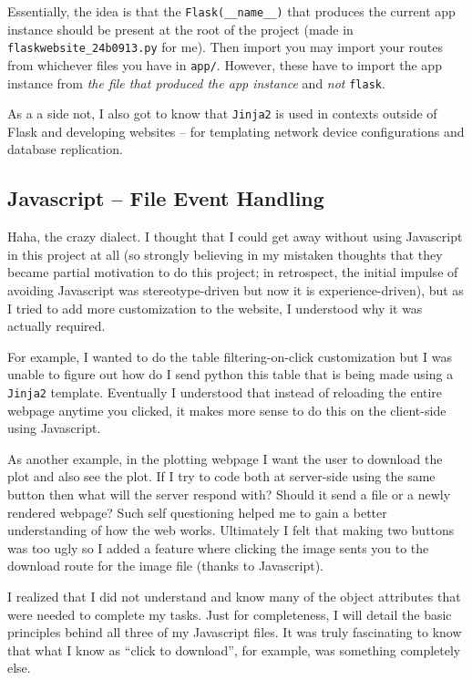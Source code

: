 \documentclass[11pt]{scrartcl}
\begin{document}
Essentially, the idea is that the \texttt{Flask(\_\_name\_\_)} that produces the
current app instance should be present at the root of the project (made
in \texttt{flaskwebsite\_24b0913.py} for me). Then import you may import your
routes from whichever files you have in \texttt{app/}. However, these have to
import the app instance from \emph{the file that produced the app instance} and
\emph{not} \texttt{flask}.

As a a side not, I also got to know that \texttt{Jinja2} is used in contexts outside of
Flask and developing websites -- for templating network device configurations
and database replication.

\subsection{Javascript -- File Event Handling}

Haha, the crazy dialect. I thought that I could get away without using
Javascript in this project at all (so strongly believing in my mistaken
thoughts that they became partial motivation to do this project; in retrospect,
the initial impulse of avoiding Javascript was stereotype-driven but now it is
experience-driven), but as I tried to add more customization to the website, I
understood why it was actually required. 

For example, I wanted to do the table filtering-on-click customization but I was
unable to figure out how do I send python this table that is being made using a
\texttt{Jinja2} template. Eventually I understood that instead of reloading the
entire webpage anytime you clicked, it makes more sense to do this on the
client-side using Javascript.

As another example, in the plotting webpage I want the user to download the plot
and also see the plot. If I try to code both at server-side using the same
button then what will the server respond with? Should it send a file or a newly
rendered webpage? Such self questioning helped me to gain a better understanding
of how the web works. Ultimately I felt that making two buttons was too ugly so
I added a feature where clicking the image sents you to the download route for
the image file (thanks to Javascript).

I realized that I did not understand and know many of the object attributes that
were needed to complete my tasks. Just for completeness, I will detail the basic
principles behind all three of my Javascript files. It was truly fascinating to
know that what I know as ``click to download'', for example, was something
completely else.
\end{document}
